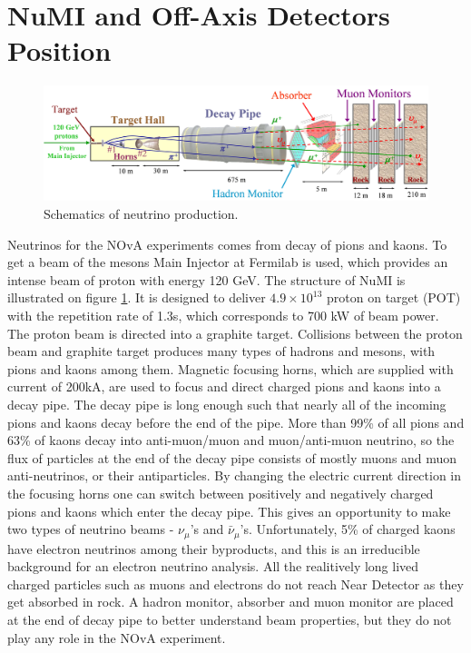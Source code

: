 \section{NuMI and Off-Axis Detectors Position}
\begin{figure}
\includegraphics[width=1.0\textwidth]{figures/Beamline.png}
\centering
\caption{Schematics of neutrino production\cite{numi}.} \label{fig:NuMI}
\end{figure}
Neutrinos for the NOvA experiments comes from decay of pions and kaons. To get a beam of 
the mesons Main Injector at Fermilab is used, which provides an intense beam of proton with 
energy 120 GeV. The structure of NuMI is illustrated on figure \ref{fig:NuMI}. It is designed to 
deliver $4.9 \times 10^{13}$ proton on target (POT) with the repetition rate of 1.3s, which 
corresponds to 700 kW of beam power. The proton beam is directed into a graphite target.  
Collisions between the proton beam and graphite target produces many types of hadrons and 
mesons, with pions and kaons among them. Magnetic focusing horns, which are supplied with 
current of 200kA, are used to focus and direct 
charged pions and kaons into a decay pipe. The decay pipe is long enough such that nearly all 
of the incoming pions and kaons decay before the end of the pipe. More than 99\% of all pions 
and 63\% of kaons decay into anti-muon/muon and muon/anti-muon neutrino, so the flux of 
particles at the end of the decay pipe consists of mostly muons and muon anti-neutrinos, or 
their antiparticles. By changing the electric current direction in the focusing horns one can 
switch between positively and negatively charged pions and kaons which enter the decay pipe. 
This gives an opportunity to make two types of neutrino beams - $\nu_\mu$'s and $\bar{\nu}_\mu$'s. 
Unfortunately, 5\% of charged kaons have electron neutrinos among their byproducts, and this 
is an irreducible background for an electron neutrino analysis. All the realitively long lived
charged particles such as muons and electrons do not reach Near Detector as they get absorbed 
in rock. A hadron monitor, absorber and muon monitor are placed at the end of decay pipe 
to better understand beam properties, but they do not play any role in the NOvA experiment.

